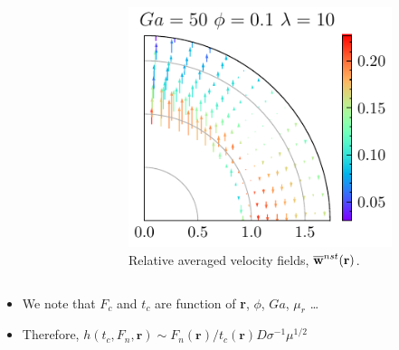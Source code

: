 \documentclass{sintefbeamer}
\begin{document}
\begin{frame}
\begin{columns}
\begin{columns}
\begin{figure}
      \end{figure}
      \centering
      \begin{figure}
      \includegraphics[width=0.9\textwidth]{image/HOMOGENEOUS/fDrop/U_mu_r_0_1_Ga_50_PHI_0_1.pdf}
      \caption{Relative averaged velocity fields, $\overline{\textbf{w}}^{nst}(\textbf{r})$.}
    \end{figure}
    \end{columns}
  \end{columns}
  \begin{itemize}
    \item We note that $F_c$ and $t_c$ are function of \textbf{r}, $\phi$, $Ga$, $\mu_r$ \ldots
    \item Therefore,
    $ h(t_c,F_n,\textbf{r})  \sim F_n(\textbf{r}) / t_c(\textbf{r}) D \sigma^{-1} \mu^{1/2}$
  \end{itemize}
\end{frame}
\end{document}
